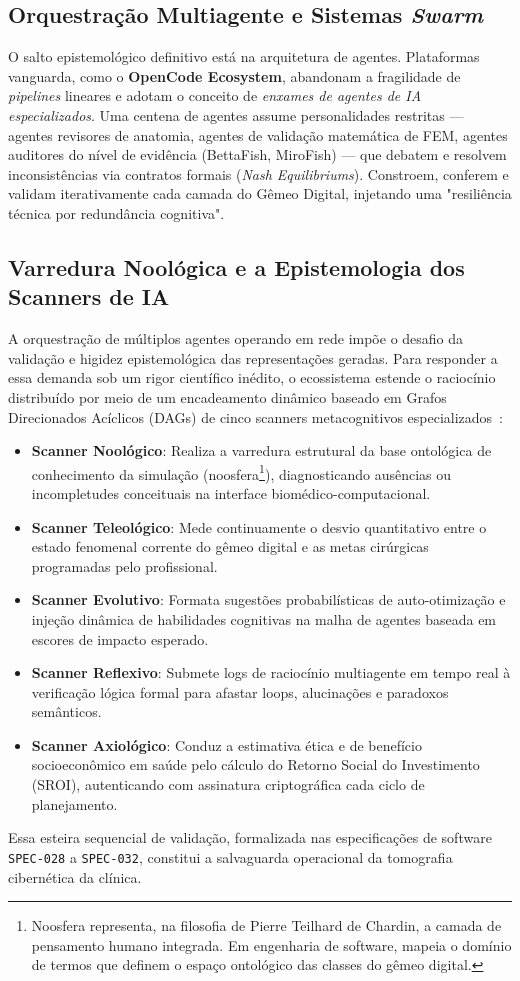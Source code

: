 \subsection{Orquestração Multiagente e Sistemas \textit{Swarm}}
O salto epistemológico definitivo está na arquitetura de agentes. Plataformas vanguarda, como o \textbf{OpenCode Ecosystem}, abandonam a fragilidade de \textit{pipelines} lineares e adotam o conceito de \textit{enxames de agentes de IA especializados}. Uma centena de agentes assume personalidades restritas — agentes revisores de anatomia, agentes de validação matemática de FEM, agentes auditores do nível de evidência (BettaFish, MiroFish) — que debatem e resolvem inconsistências via contratos formais (\textit{Nash Equilibriums}). Constroem, conferem e validam iterativamente cada camada do Gêmeo Digital, injetando uma "resiliência técnica por redundância cognitiva".

\subsection{Varredura Noológica e a Epistemologia dos Scanners de IA}

A orquestração de múltiplos agentes operando em rede impõe o desafio da validação e higidez epistemológica das representações geradas. Para responder a essa demanda sob um rigor científico inédito, o ecossistema estende o raciocínio distribuído por meio de um encadeamento dinâmico baseado em Grafos Direcionados Acíclicos (DAGs) de cinco scanners metacognitivos especializados~\cite{katsoulakis2024digital, roy2025applications}:
\begin{itemize}
    \item \textbf{Scanner Noológico}: Realiza a varredura estrutural da base ontológica de conhecimento da simulação (noosfera\footnote{Noosfera representa, na filosofia de Pierre Teilhard de Chardin, a camada de pensamento humano integrada. Em engenharia de software, mapeia o domínio de termos que definem o espaço ontológico das classes do gêmeo digital.}), diagnosticando ausências ou incompletudes conceituais na interface biomédico-computacional.
    \item \textbf{Scanner Teleológico}: Mede continuamente o desvio quantitativo entre o estado fenomenal corrente do gêmeo digital e as metas cirúrgicas programadas pelo profissional.
    \item \textbf{Scanner Evolutivo}: Formata sugestões probabilísticas de auto-otimização e injeção dinâmica de habilidades cognitivas na malha de agentes baseada em escores de impacto esperado.
    \item \textbf{Scanner Reflexivo}: Submete logs de raciocínio multiagente em tempo real à verificação lógica formal para afastar loops, alucinações e paradoxos semânticos.
    \item \textbf{Scanner Axiológico}: Conduz a estimativa ética e de benefício socioeconômico em saúde pelo cálculo do Retorno Social do Investimento (SROI), autenticando com assinatura criptográfica cada ciclo de planejamento.
\end{itemize}
Essa esteira sequencial de validação, formalizada nas especificações de software \texttt{SPEC-028} a \texttt{SPEC-032}, constitui a salvaguarda operacional da tomografia cibernética da clínica.

